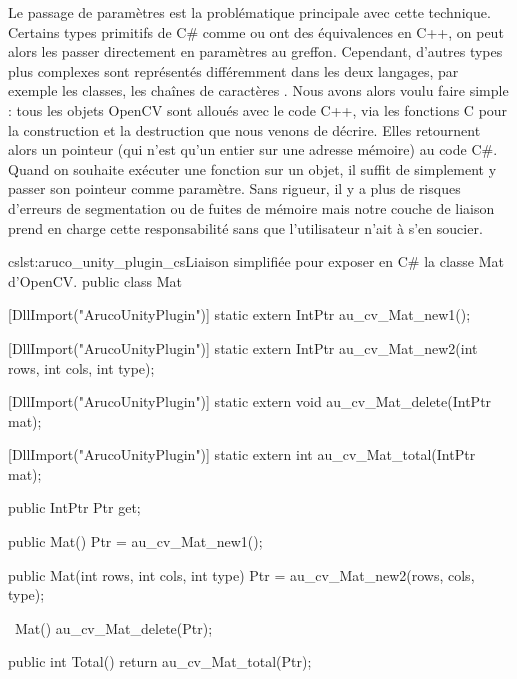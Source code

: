 Le passage de paramètres est la problématique principale avec cette technique. Certains types primitifs de C\# comme  ou  ont des équivalences en C++, on peut alors les passer directement en paramètres au greffon. Cependant, d'autres types plus complexes sont représentés différemment dans les deux langages, par exemple les classes, les chaînes de caractères \cite{Peterson2015}. Nous avons alors voulu faire simple : tous les objets OpenCV sont alloués avec le code C++, via les fonctions C pour la construction et la destruction que nous venons de décrire. Elles retournent alors un pointeur (qui n'est qu'un entier sur une adresse mémoire) au code C\#. Quand on souhaite exécuter une fonction sur un objet, il suffit de simplement y passer son pointeur comme paramètre. Sans rigueur, il y a plus de risques d'erreurs de segmentation ou de fuites de mémoire mais notre couche de liaison prend en charge cette responsabilité sans que l'utilisateur n'ait à s'en soucier.

\begin{listingETS}{cs}{lst:aruco_unity_plugin_cs}{Liaison simplifiée pour exposer en C\# la classe Mat d'OpenCV.}
  public class Mat
  {
    [DllImport("ArucoUnityPlugin")]
    static extern IntPtr au_cv_Mat_new1();

    [DllImport("ArucoUnityPlugin")]
    static extern IntPtr au_cv_Mat_new2(int rows, int cols, int type);

    [DllImport("ArucoUnityPlugin")]
    static extern void au_cv_Mat_delete(IntPtr mat);
    
    [DllImport("ArucoUnityPlugin")]
    static extern int au_cv_Mat_total(IntPtr mat);

    public IntPtr Ptr { get; }

    public Mat()
    {
      Ptr = au_cv_Mat_new1();
    }

    public Mat(int rows, int cols, int type)
    {
      Ptr = au_cv_Mat_new2(rows, cols, type);
    }

    ~Mat()
    {
      au_cv_Mat_delete(Ptr);
    }

    public int Total()
    {
      return au_cv_Mat_total(Ptr);
    }
  }
\end{listingETS}

